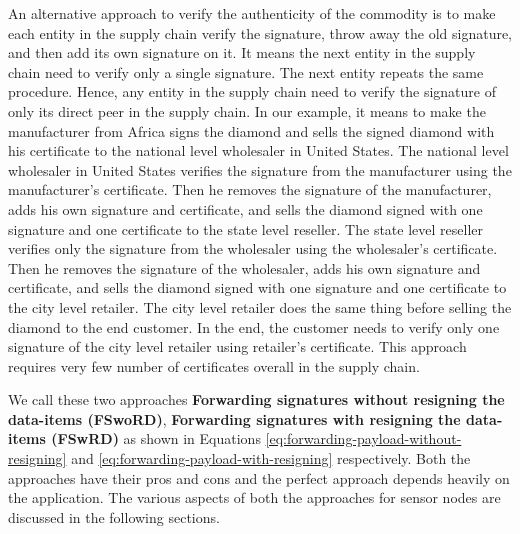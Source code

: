 	An alternative approach to verify the authenticity of the commodity is to make each entity in the supply chain verify the signature, throw away the old signature, and then add its own signature on it. 
	It means the next entity in the supply chain need to verify only a single signature.
	The next entity repeats the same procedure.
	Hence, any entity in the supply chain need to verify the signature of only its direct peer in the supply chain. 
	In our example, it means to make the manufacturer from Africa signs the diamond and sells the signed diamond with his certificate to the national level wholesaler in United States.
	The national level wholesaler in United States verifies the signature from the manufacturer using the manufacturer's certificate.
	Then he removes the signature of the manufacturer, adds his own signature and certificate, and sells the diamond signed with one signature and one certificate to the state level reseller.
	The state level reseller verifies only the signature from the wholesaler using the wholesaler's certificate.
	Then he removes the signature of the wholesaler, adds his own signature and certificate, and sells the diamond signed with one signature and one certificate to the city level retailer.
	The city level retailer does the same thing before selling the diamond to the end customer.
	In the end, the customer needs to verify only one signature of the city level retailer using retailer's certificate.
	This approach requires very few number of certificates overall in the supply chain.

	We call these two approaches \textbf{Forwarding signatures without resigning the data-items (FSwoRD)}, \textbf{Forwarding signatures with resigning the data-items (FSwRD)} as shown in Equations \ref{eq:forwarding-payload-without-resigning} and \ref{eq:forwarding-payload-with-resigning} respectively.
	Both the approaches have their pros and cons and the perfect approach depends heavily on the application.
	The various aspects of both the approaches for sensor nodes are discussed in the following sections.
